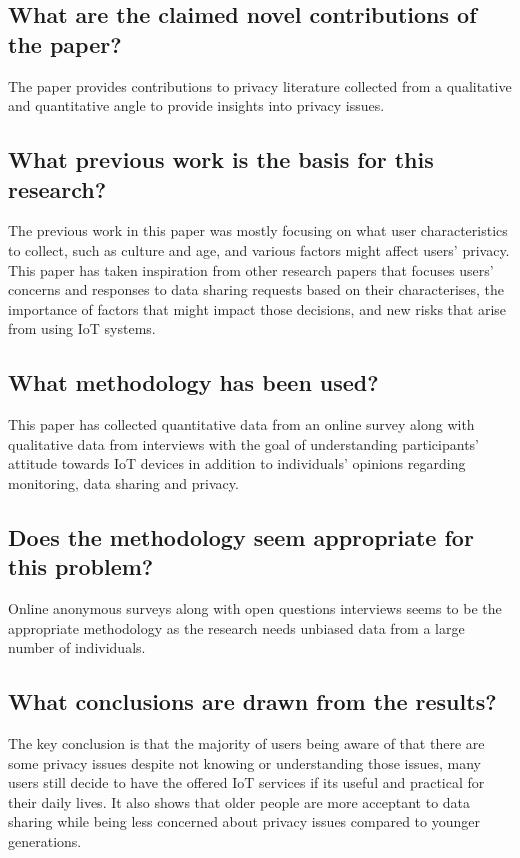 \documentclass[11pt,a4paper]{article}
\begin{document}
\subsection*{What are the claimed novel contributions of the paper?}
The paper provides contributions to privacy literature collected from a qualitative and quantitative angle to provide insights into privacy issues. 

\subsection*{What previous work is the basis for this research?}
The previous work in this paper was mostly focusing on what user characteristics to collect, such as culture and age, and various factors might affect users’ privacy. This paper has taken inspiration from other research papers that focuses users’ concerns and responses to data sharing requests based on their characterises, the importance of factors that might impact those decisions, and new risks that arise from using IoT systems.

\subsection*{What methodology has been used?}
This paper has collected quantitative data from an online survey along with qualitative data from interviews with the goal of understanding participants’ attitude towards IoT devices in addition to individuals’ opinions regarding monitoring, data sharing and privacy. 

\subsection*{Does the methodology seem appropriate for this problem?}
Online anonymous surveys along with open questions interviews seems to be the appropriate methodology as the research needs unbiased data from a large number of individuals. 

\subsection*{What conclusions are drawn from the results?}
The key conclusion is that the majority of users being aware of that there are some privacy issues despite not knowing or understanding those issues, many users still decide to have the offered IoT services if its useful and practical for their daily lives. It also shows that older people are more acceptant to data sharing while being less concerned about privacy issues compared to younger generations. 
\end{document}
